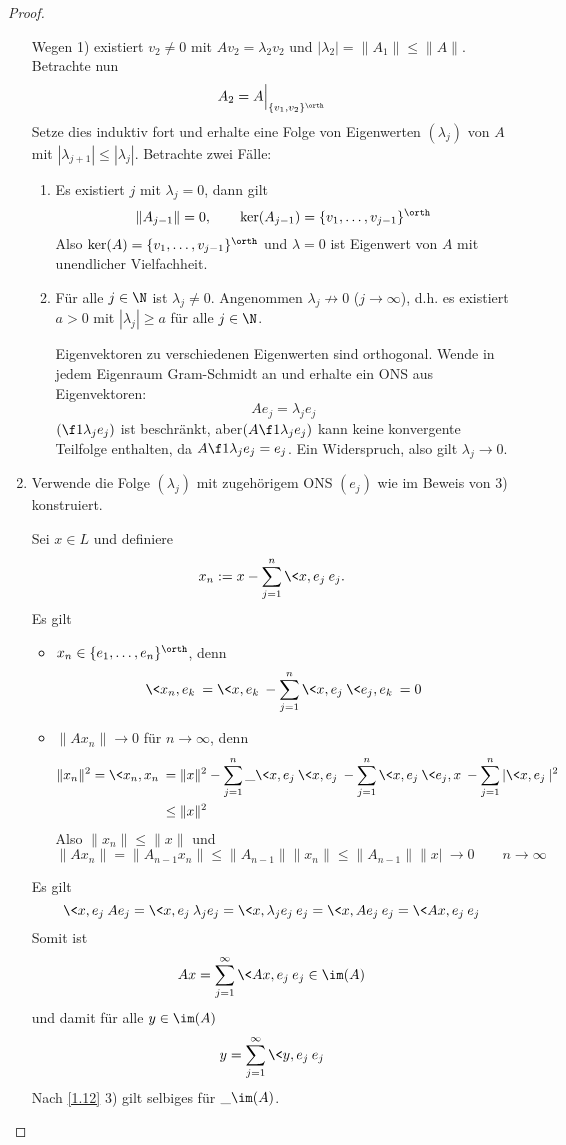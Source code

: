 \begin{st}
\begin{proof}
\begin{enumerate}[1)]
				Wegen 1) existiert $v_2 \neq 0$ mit $Av_2 = \lambda_2v_2$ und $|\lambda_2| = \|A_1\| \le \|A\|$.
				Betrachte nun 
				\[
					A_2 = A \Big|_{\{v_1,v_2\}^\orth} 
				\]
				Setze dies induktiv fort und erhalte eine Folge von Eigenwerten $(\lambda_j)$ von $A$ mit $|\lambda_{j+1}| \le |\lambda_j|$.
				Betrachte zwei Fälle:
				\begin{enumerate}[1. {Fall}]
					\item
						Es existiert $j$ mit $\lambda_j = 0$, dann gilt
						\[
							\|A_{j-1}\| = 0, \qquad \ker(A_{j-1}) = \{v_1,\dotsc,v_{j-1}\}^\orth
						\]
						Also $\ker(A) = \{v_1, \dotsc, v_{j-1}\}^\orth$ und $\lambda = 0$ ist Eigenwert von $A$ mit unendlicher Vielfachheit.
					\item
						Für alle $j \in \N$ ist $\lambda_j \neq 0$.
						Angenommen $\lambda_j \not\to 0$ ($j \to \infty$), d.h. es existiert $a > 0$ mit $|\lambda_j| \ge a$ für alle $j \in \N$.

						Eigenvektoren zu verschiedenen Eigenwerten sind orthogonal.
						Wende in jedem Eigenraum Gram-Schmidt an und erhalte ein ONS aus Eigenvektoren:
						\[
							A e_j = \lambda_j e_j
						\]
						$(\f 1 {\lambda_j} e_j)$ ist beschränkt, aber$(A \f 1 {\lambda_j} e_j)$ kann keine konvergente Teilfolge enthalten, da $A \f 1 {\lambda_j} e_j = e_j$.
						Ein Widerspruch, also gilt $\lambda_j \to 0$.
				\end{enumerate}
			\item
				Verwende die Folge $(\lambda_j)$ mit zugehörigem ONS $(e_j)$ wie im Beweis von 3) konstruiert.

				Sei $x \in L$ und definiere
				\[
					x_n := x - \sum_{j=1}^n \<x,e_j\> e_j.
				\]
				Es gilt
				\begin{itemize}
					\item
						$x_n \in \{e_1,\dotsc,e_n\}^\orth$, denn
						\[
							\<x_n, e_k\> = \<x, e_k\> - \sum_{j=1}^n \<x,e_j\> \<e_j, e_k\> = 0
						\]
					\item
						$\|Ax_n\| \to 0$ für $n\to \infty$, denn
						\begin{align*}
							\|x_n\|^2  = \<x_n, x_n\>
							&= \|x\|^2 - \sum_{j=1}^n \_{\<x,e_j\>}\<x,e_j\> - \sum_{j=1}^n \<x,e_j\> \<e_j,x\> - \sum_{j=1}^n |\<x,e_j\>|^2 \\
							&\le \|x\|^2
						\end{align*}
						Also $\|x_n\| \le \|x\|$ und
						\[
							\|Ax_n\| = \|A_{n-1}x_n\| \le \|A_{n-1}\| \|x_n\| \le \|A_{n-1}\| \|x|\ \to 0
							\qquad n \to \infty
						\]
				\end{itemize}
				Es gilt
				\[
					\<x,e_j\> A e_j
					= \<x,e_j\> \lambda_j e_j
					= \<x,\lambda_j e_j\> e_j
					= \<x,A e_j\> e_j
					= \<Ax,e_j\> e_j
				\]
				Somit ist
				\[
					Ax = \sum_{j=1}^\infty \<Ax, e_j\> e_j \in \im (A)
				\]
				und damit für alle $y \in \im (A)$
				\[
					y = \sum_{j=1}^\infty \<y,e_j\> e_j
				\]
				Nach \ref{1.12} 3) gilt selbiges für $\_{\im (A)}$.
		\end{enumerate}
	\end{proof}
\end{st}

